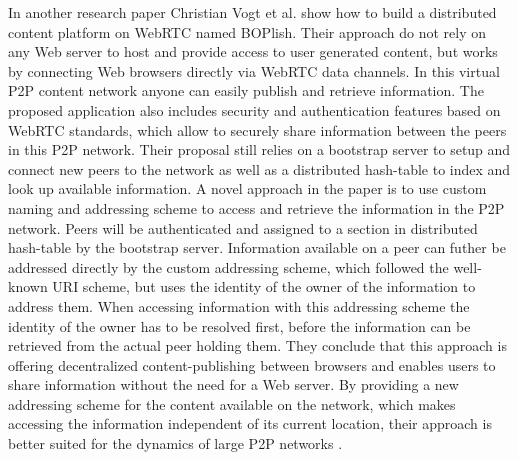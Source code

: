 In another research paper Christian Vogt et al. show how to build a distributed content platform on \gls{WebRTC} named BOPlish. Their approach do not rely on any Web server to host and provide access to user generated content, but works by connecting Web browsers directly via \gls{WebRTC} data channels. In this virtual \gls{P2P} content network anyone can easily publish and retrieve information. The proposed application also includes security and authentication features based on \gls{WebRTC} standards, which allow to securely share information between the peers in this \gls{P2P} network. Their proposal still relies on a bootstrap server to setup and connect new peers to the network as well as a distributed hash-table to index and look up available information. A novel approach in the paper is to use custom naming and addressing scheme to access and retrieve the information in the \gls{P2P} network. Peers will be authenticated and assigned to a section in distributed hash-table by the bootstrap server. Information available on a peer can futher be addressed directly by the custom addressing scheme, which followed the well-known \gls{URI} scheme, but uses the identity of the owner of the information to address them. When accessing information with this addressing scheme the identity of the owner has to be resolved first, before the information can be retrieved from the actual peer holding them. They conclude that this approach is offering decentralized content-publishing between browsers and enables users to share information without the need for a Web server. By providing a new addressing scheme for the content available on the network, which makes accessing the information independent of its current location, their approach is better suited for the dynamics of large \gls{P2P} networks \citep{vogt2013content}.

